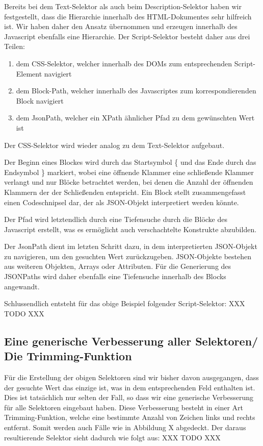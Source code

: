 Bereits bei dem Text-Selektor als auch beim Description-Selektor haben wir festgestellt, dass die Hierarchie
innerhalb des HTML-Dokumentes sehr hilfreich ist.
Wir haben daher den Ansatz übernommen und erzeugen innerhalb des Javascript ebenfalls eine Hierarchie.
Der Script-Selektor besteht daher aus drei Teilen:
\begin{enumerate}
    \item dem CSS-Selektor, welcher innerhalb des DOMs zum entsprechenden Script-Element navigiert
    \item dem Block-Path, welcher innerhalb des Javascriptes zum korrespondierenden Block navigiert
    \item dem JsonPath, welcher ein XPath ähnlicher Pfad zu dem gewünschten Wert ist
\end{enumerate}

Der CSS-Selektor wird wieder analog zu dem Text-Selektor aufgebaut.

Der Beginn eines Blockes wird durch das Startsymbol \{ und das Ende durch das Endsymbol \} markiert, wobei eine
öffnende Klammer eine schließende Klammer verlangt und nur Blöcke betrachtet werden, bei denen die Anzahl der
öffnenden Klammern der der Schließenden entspricht.
Ein Block stellt zusammengefasst einen Codeschnipsel dar, der als JSON-Objekt interpretiert werden könnte.

Der Pfad wird letztendlich durch eine Tiefensuche durch die Blöcke des Javascript erstellt, was es ermöglicht auch
verschachtelte Konstrukte abzubilden.

Der JsonPath dient im letzten Schritt dazu, in dem interpretierten JSON-Objekt zu navigieren, um den gesuchten Wert
zurückzugeben.
JSON-Objekte bestehen aus weiteren Objekten, Arrays oder Attributen.
Für die Generierung des JSONPaths wird daher ebenfalls eine Tiefensuche innerhalb des Blocks angewandt.

Schlussendlich entsteht für das obige Beispiel folgender Script-Selektor:
XXX TODO XXX

\subsection{Eine generische Verbesserung aller Selektoren/ Die Trimming-Funktion}
\label{subsec:generische-verbesserung}

Für die Erstellung der obigen Selektoren sind wir bisher davon ausgegangen, dass der gesuchte Wert das einzige ist,
was in dem entsprechenden Feld enthalten ist.
Dies ist tatsächlich nur selten der Fall, so dass wir eine generische Verbesserung für alle Selektoren eingebaut haben.
Diese Verbesserung besteht in einer Art Trimming-Funktion, welche eine bestimmte Anzahl von Zeichen links und rechts
entfernt.
Somit werden auch Fälle wie in Abbildung X abgedeckt.
Der daraus resultierende Selektor sieht dadurch wie folgt aus:
XXX TODO XXX

